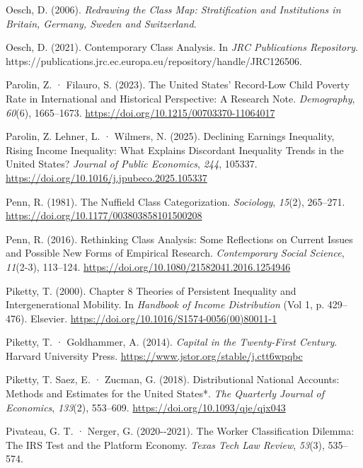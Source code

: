 \documentclass[
  letterpaper,
  DIV=11,
  numbers=noendperiod]{scrartcl}
\newlength{\cslhangindent}
\newenvironment{CSLReferences}[2] %
 {\begin{list}{}{%
  \setlength{\itemindent}{0pt}
  \setlength{\leftmargin}{0pt}
  \setlength{\parsep}{0pt}
  \ifodd #1
   \setlength{\leftmargin}{\cslhangindent}
   \setlength{\itemindent}{-1\cslhangindent}
  \fi
  \setlength{\itemsep}{#2\baselineskip}}}
 {\end{list}}
\begin{document}
\begin{CSLReferences}{1}{0}
Oesch, D. (2006). \emph{Redrawing the {Class Map}: {Stratification} and
{Institutions} in {Britain}, {Germany}, {Sweden} and {Switzerland}}.

Oesch, D. (2021). Contemporary {Class Analysis}. In \emph{JRC
Publications Repository}.
https://publications.jrc.ec.europa.eu/repository/handle/JRC126506.

Parolin, Z. · Filauro, S. (2023). The {United States}' {Record-Low Child
Poverty Rate} in {International} and {Historical Perspective}: {A
Research Note}. \emph{Demography}, \emph{60}(6), 1665--1673.
\url{https://doi.org/10.1215/00703370-11064017}

Parolin, Z. Lehner, L. · Wilmers, N. (2025). Declining Earnings
Inequality, Rising Income Inequality: {What} Explains Discordant
Inequality Trends in the {United States}? \emph{Journal of Public
Economics}, \emph{244}, 105337.
\url{https://doi.org/10.1016/j.jpubeco.2025.105337}

Penn, R. (1981). The {Nuffield Class Categorization}. \emph{Sociology},
\emph{15}(2), 265--271. \url{https://doi.org/10.1177/003803858101500208}

Penn, R. (2016). Rethinking Class Analysis: Some Reflections on Current
Issues and Possible New Forms of Empirical Research. \emph{Contemporary
Social Science}, \emph{11}(2-3), 113--124.
\url{https://doi.org/10.1080/21582041.2016.1254946}

Piketty, T. (2000). Chapter 8 {Theories} of Persistent Inequality and
Intergenerational Mobility. In \emph{Handbook of {Income Distribution}}
(Vol 1, p. 429--476). Elsevier.
\url{https://doi.org/10.1016/S1574-0056(00)80011-1}

Piketty, T. · Goldhammer, A. (2014). \emph{Capital in the {Twenty-First
Century}}. Harvard University Press.
\url{https://www.jstor.org/stable/j.ctt6wpqbc}

Piketty, T. Saez, E. · Zucman, G. (2018). Distributional {National
Accounts}: {Methods} and {Estimates} for the {United States}*. \emph{The
Quarterly Journal of Economics}, \emph{133}(2), 553--609.
\url{https://doi.org/10.1093/qje/qjx043}

Pivateau, G. T. · Nerger, G. (2020-\/-2021). The {Worker Classification
Dilemma}: {The IRS Test} and the {Platform Economy}. \emph{Texas Tech
Law Review}, \emph{53}(3), 535--574.


\end{CSLReferences}
\end{document}

